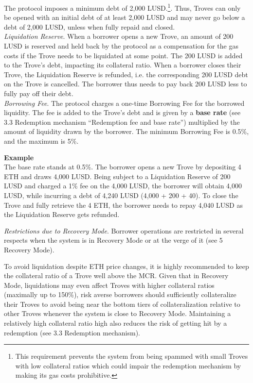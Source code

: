 \documentclass{article}
\begin{document}
The protocol imposes a minimum debt of 2,000 LUSD.\footnote{This requirement prevents the system from being spammed with small Troves with low collateral ratios which could impair the redemption mechanism by making its gas costs prohibitive.}. Thus, Troves can only be opened with an initial debt of at least 2,000 LUSD and may never go below a debt of 2,000 LUSD, unless when fully repaid and closed.
\\


\textit{Liquidation Reserve}. When a borrower opens a new Trove, an amount of 200 LUSD is reserved and held back by the protocol as a compensation for the gas costs if the Trove needs to be liquidated at some point. The 200 LUSD is added to the Trove's debt, impacting its collateral ratio. When a borrower closes their Trove, the Liquidation Reserve is refunded, i.e. the corresponding 200 LUSD debt on the Trove is cancelled. The borrower thus needs to pay back 200 LUSD less to fully pay off their debt. \\

\textit{Borrowing Fee}.   The protocol charges a one-time Borrowing Fee for the borrowed liquidity. The fee is added to the Trove's debt and is given by a \textbf{base rate} (see 3.3 Redemption mechanism “Redemption fee and base rate”) multiplied by the amount of liquidity drawn by the borrower. The minimum Borrowing Fee is 0.5\%, and the maximum is 5\%. \\

\begin{tcolorbox}
\textbf{Example}\\
The base rate stands at 0.5\%. The borrower opens a new Trove by depositing 4 ETH and draws 4,000 LUSD. Being subject to a Liquidation Reserve of 200 LUSD and charged a 1\% fee on the 4,000 LUSD, the borrower will obtain 4,000 LUSD, while incurring a debt of 4,240 LUSD (4,000 + 200 + 40). To close the Trove and fully retrieve the 4 ETH, the borrower needs to repay 4,040 LUSD as the Liquidation Reserve gets refunded.
\end{tcolorbox}

\textit{Restrictions due to Recovery Mode}.   Borrower operations are restricted in several respects when the system is in Recovery Mode or at the verge of it (see 5 Recovery Mode). 

To avoid liquidation despite ETH price changes, it is highly recommended to keep the collateral ratio of a Trove well above the MCR. Given that in Recovery Mode, liquidations may even affect Troves with higher collateral ratios (maximally up to 150\%), risk averse borrowers should sufficiently collateralize their Troves to avoid being near the bottom tiers of collateralization relative to other Troves whenever the system is close to Recovery Mode. Maintaining a relatively high collateral ratio high also reduces the risk of getting hit by a redemption (see 3.3 Redemption mechanism).
\end{document}
